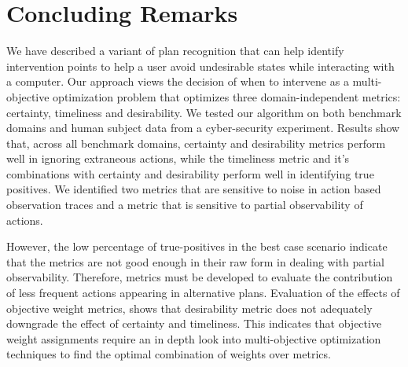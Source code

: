 \section{Concluding Remarks}
We have described a variant of plan recognition that can help identify intervention points to help a user avoid undesirable states while interacting with a computer. Our approach views the decision of when to intervene as a multi-objective optimization problem that optimizes three domain-independent  metrics: certainty, timeliness and desirability. We tested our algorithm on both benchmark domains and human subject data from a cyber-security experiment. Results show that, across all benchmark domains, certainty and desirability metrics perform well in ignoring extraneous actions, while the timeliness metric and it's combinations with certainty and desirability perform well in identifying true positives. We identified two metrics that are sensitive to noise in action based observation traces and a metric that is sensitive to partial observability of actions.

However, the low percentage of true-positives in the best case scenario indicate that the metrics are not good enough in their raw form in dealing with partial observability. Therefore, metrics must be developed to evaluate the contribution of less frequent actions appearing in alternative plans. Evaluation of the effects of objective weight metrics, shows that desirability metric does not adequately downgrade the effect of certainty and timeliness. This indicates that objective weight assignments require an in depth look into multi-objective optimization techniques to find the optimal combination of weights over metrics.

